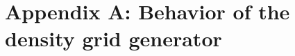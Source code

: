 \documentclass{JASSS}
\begin{document}










\endparano






\section{Appendix A: Behavior of the density grid generator}
\end{document}
